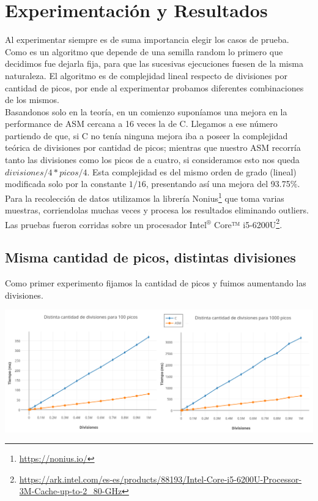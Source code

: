 \section{Experimentación y Resultados}

Al experimentar siempre es de suma importancia elegir los casos de prueba. Como es un algoritmo que depende de una semilla random lo primero que decidimos fue dejarla fija, para que las sucesivas ejecuciones fuesen de la misma naturaleza. El algoritmo es de complejidad lineal respecto de divisiones por cantidad de picos, por ende al experimentar probamos diferentes combinaciones de los mismos.\\

Basandonos solo en la teoría, en un comienzo suponíamos una mejora en la performance de ASM cercana a 16 veces la de C. Llegamos a ese número partiendo de que, si C no tenía ninguna mejora iba a poseer la complejidad teórica de divisiones por cantidad de picos; mientras que nuestro ASM recorría tanto las divisiones como los picos de a cuatro, si consideramos esto nos queda $divisiones/4 * picos/4$. Esta complejidad es del mismo orden de grado (lineal) modificada solo por la constante $1/16$, presentando así una mejora del 93.75$\%$.\\

Para la recolección de datos utilizamos la librería Nonius\footnote{\url{https://nonius.io/}} que toma varias muestras, corriendolas muchas veces y procesa los resultados eliminando outliers. Las pruebas fueron corridas sobre un procesador Intel$^{®}$ Core™ i5-6200U\footnote{\url{https://ark.intel.com/es-es/products/88193/Intel-Core-i5-6200U-Processor-3M-Cache-up-to-2_80-GHz}}.

\subsection{Misma cantidad de picos, distintas divisiones}
Como primer experimento fijamos la cantidad de picos y fuimos aumentando las divisiones.

\centerline{\includegraphics[scale=0.45]{imagenes/distintasDivisionesParaPicos.png}}

